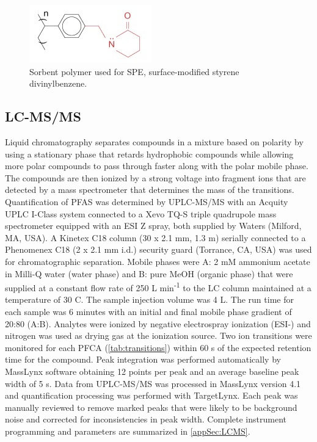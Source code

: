 \begin{figure}
    \centering
    \includegraphics{Bilder/SPE_LCMS/mg_spe_strata-x.jpg}
    \caption{Sorbent polymer used for SPE, surface-modified styrene divinylbenzene.}
    \label{fig:StatPhase}
\end{figure}

\subsection{LC-MS/MS}
Liquid chromatography separates compounds in a mixture based on polarity by using a stationary phase that retards hydrophobic compounds while allowing more polar compounds to pass through faster along with the polar mobile phase. The compounds are then ionized by a strong voltage into fragment ions that are detected by a mass spectrometer that determines the mass of the transitions. Quantification of PFAS was determined by UPLC-MS/MS with an Acquity UPLC I-Class system connected to a Xevo TQ-S triple quadrupole mass spectrometer equipped with an ESI Z spray, both supplied by Waters (Milford, MA, USA). A Kinetex C18 column (30 x 2.1 mm, 1.3 \textmu m) serially connected to a Phenomenex C18 (2 x 2.1 mm i.d.) security guard (Torrance, CA, USA) was used for chromatographic separation. Mobile phases were A: 2 mM ammonium acetate in Milli-Q water (water phase) and B: pure MeOH (organic phase) that were supplied at a constant flow rate of 250 \textmu L min\textsuperscript{-1} to the LC column maintained at a temperature of 30 \textdegree C. The sample injection volume was 4 \textmu L. The run time for each sample was 6 minutes with an initial and final mobile phase gradient of 20:80 (A:B). Analytes were ionized by negative electrospray ionization (ESI-) and nitrogen was used as drying gas at the ionization source. Two ion transitions were monitored for each PFCA (\cref{tab:transitions}) within 60 s of the expected retention time for the compound. Peak integration was performed automatically by MassLynx software obtaining 12 points per peak and an average baseline peak width of 5 s. Data from UPLC-MS/MS was processed in MassLynx version 4.1 and quantification processing was performed with TargetLynx. Each peak was manually reviewed to remove marked peaks that were likely to be background noise and corrected for inconsistencies in peak width. Complete instrument programming and parameters are summarized in \cref{appSec:LCMS}.


